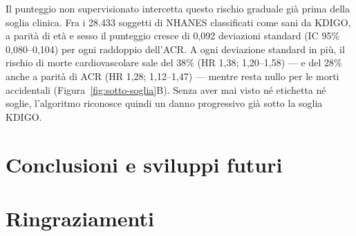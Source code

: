 \documentclass[a4paper, 12pt, oneside]{book}
\begin{document}
Il punteggio non supervisionato intercetta questo rischio graduale già prima della soglia clinica. Fra i 28.433 soggetti di NHANES classificati come sani da KDIGO, a parità di età e sesso il punteggio cresce di 0,092 deviazioni standard (IC 95\% 0,080--0,104) per ogni raddoppio dell'ACR. A ogni deviazione standard in più, il rischio di morte cardiovascolare sale del 38\% (HR 1,38; 1,20--1,58) — e del 28\% anche a parità di ACR (HR 1,28; 1,12--1,47) — mentre resta nullo per le morti accidentali (Figura~\ref{fig:sotto-soglia}B). Senza aver mai visto né etichetta né soglie, l'algoritmo riconosce quindi un danno progressivo già sotto la soglia KDIGO.

\chapter{Conclusioni e sviluppi futuri}

\chapter*{Ringraziamenti}
\clearpage
\cleardoublepage
{}
 
       
\clearpage
\listoffigures
{}
\clearpage
\listoftables
{}
\clearpage
\end{document}
